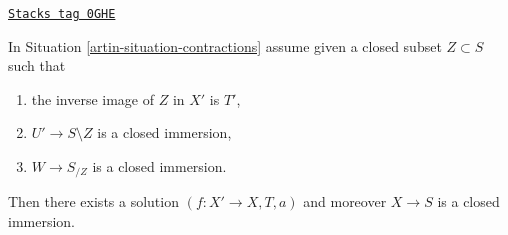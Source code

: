 \begin{lemma}
\label{artin-lemma-closed-immersion}
\href{https://stacks.math.columbia.edu/tag/0GHE}{\texttt{Stacks tag 0GHE}}

In Situation \ref{artin-situation-contractions} assume given a closed
subset $Z \subset S$ such that
\begin{enumerate}
\item the inverse image of $Z$ in $X'$ is $T'$,
\item $U' \to S \setminus Z$ is a closed immersion,
\item $W \to S_{/Z}$ is a closed immersion.
\end{enumerate}
Then there exists a solution $(f : X' \to X, T, a)$
and moreover $X \to S$ is a closed immersion.
\end{lemma}

